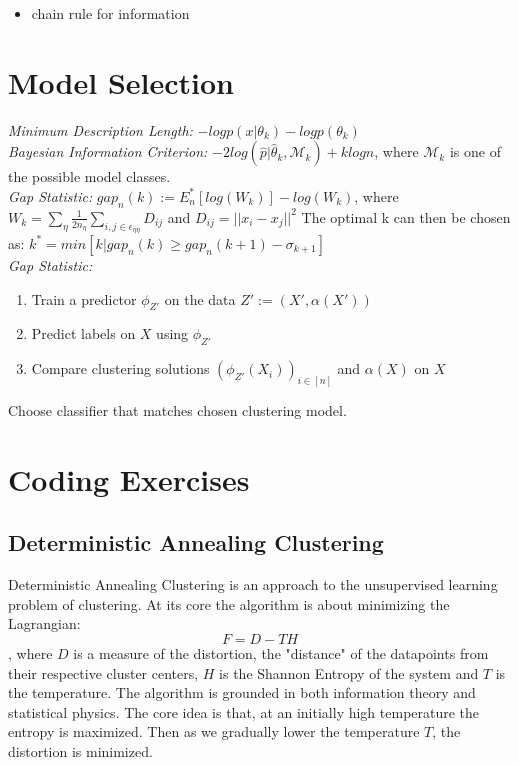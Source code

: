 \documentclass[9pt,parskip]{scrartcl}
\begin{document}
\begin{multicols*}{4}
\vspace{5cm}
\begin{itemize}
	\item chain rule for information
\end{itemize}
\section*{Model Selection}
\textit{Minimum Description Length: } $-log p (x|\theta_k) - log p(\theta_k)$ \\

\textit{Bayesian Information Criterion:} $-2 log (\hat p | \hat \theta_k, \mathcal{M}_k)  + k log n$, where $\mathcal{M}_k$ is one of the possible model classes. \\
\textit{Gap Statistic:} $gap_n(k) := E_n^*[log(W_k)] - log(W_k)$, where $W_k = \sum_{\eta}\frac{1}{2n_{\eta}} \sum_{i,j \in \epsilon_{\eta \eta}} D_{ij}$ and $D_{ij} = ||x_i -x_j||^2$
The optimal k can then be chosen as: $k^* = min[k|gap_n(k) \geq gap_n(k+1) - \sigma_{k+1}]$ \\

\textit{Gap Statistic:}
\begin{enumerate}
    \item Train a predictor $\phi_{Z'}$ on the data $Z' := (X', \alpha(X'))$
    \item Predict labels on $X$ using $\phi_{Z'}$
    \item Compare clustering solutions $(\phi_{Z'}(X_i))_{i \in [n]}$ and $\alpha(X)$ on $X$
\end{enumerate}

Choose classifier that matches chosen clustering model. 

\section*{Coding Exercises}
\subsection*{Deterministic Annealing Clustering}
Deterministic Annealing Clustering is an approach to the unsupervised learning problem of clustering. At its core the algorithm is about minimizing the Lagrangian: $$F = D - TH$$
, where $D$ is a measure of the distortion, the "distance" of the datapoints from their respective cluster centers, $H$ is the Shannon Entropy of the system and $T$ is the temperature. The algorithm is grounded in both information theory and statistical physics. The core idea is that, at an initially high temperature the entropy is maximized. Then as we gradually lower the temperature $T$, the distortion is minimized. 


\end{multicols*}
\end{document}
